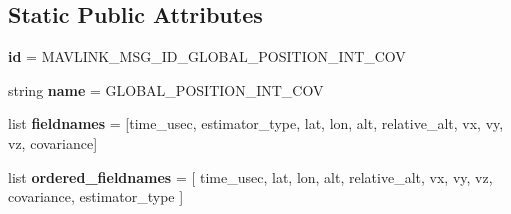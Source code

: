 \subsection*{Static Public Attributes}
\begin{DoxyCompactItemize}
\item 
\mbox{\label{classpymavlink_1_1dialects_1_1v10_1_1MAVLink__global__position__int__cov__message_a9a27042c6efeade09e1b84e625dd4546}} 
{\bfseries id} = M\+A\+V\+L\+I\+N\+K\+\_\+\+M\+S\+G\+\_\+\+I\+D\+\_\+\+G\+L\+O\+B\+A\+L\+\_\+\+P\+O\+S\+I\+T\+I\+O\+N\+\_\+\+I\+N\+T\+\_\+\+C\+OV
\item 
\mbox{\label{classpymavlink_1_1dialects_1_1v10_1_1MAVLink__global__position__int__cov__message_ad7a1c3ca773c86da22330e000d6f67a6}} 
string {\bfseries name} = \textquotesingle{}G\+L\+O\+B\+A\+L\+\_\+\+P\+O\+S\+I\+T\+I\+O\+N\+\_\+\+I\+N\+T\+\_\+\+C\+OV\textquotesingle{}
\item 
\mbox{\label{classpymavlink_1_1dialects_1_1v10_1_1MAVLink__global__position__int__cov__message_a61fe691b7a040360c76ce9e70c47dbc1}} 
list {\bfseries fieldnames} = \mbox{[}\textquotesingle{}time\+\_\+usec\textquotesingle{}, \textquotesingle{}estimator\+\_\+type\textquotesingle{}, \textquotesingle{}lat\textquotesingle{}, \textquotesingle{}lon\textquotesingle{}, \textquotesingle{}alt\textquotesingle{}, \textquotesingle{}relative\+\_\+alt\textquotesingle{}, \textquotesingle{}vx\textquotesingle{}, \textquotesingle{}vy\textquotesingle{}, \textquotesingle{}vz\textquotesingle{}, \textquotesingle{}covariance\textquotesingle{}\mbox{]}
\item 
\mbox{\label{classpymavlink_1_1dialects_1_1v10_1_1MAVLink__global__position__int__cov__message_a906a0cd7f903b4705ce44dc6559da1c0}} 
list {\bfseries ordered\+\_\+fieldnames} = \mbox{[} \textquotesingle{}time\+\_\+usec\textquotesingle{}, \textquotesingle{}lat\textquotesingle{}, \textquotesingle{}lon\textquotesingle{}, \textquotesingle{}alt\textquotesingle{}, \textquotesingle{}relative\+\_\+alt\textquotesingle{}, \textquotesingle{}vx\textquotesingle{}, \textquotesingle{}vy\textquotesingle{}, \textquotesingle{}vz\textquotesingle{}, \textquotesingle{}covariance\textquotesingle{}, \textquotesingle{}estimator\+\_\+type\textquotesingle{} \mbox{]}

\end{DoxyCompactItemize}
